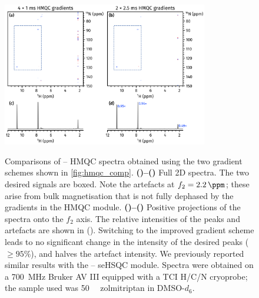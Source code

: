 \documentclass[a4paper,11pt]{article}
\newcommand{\proton}{\ch{^{1}H}}
\newcommand{\nitrogen}{\ch{^{15}N}}
\newcommand{\HN}{\proton{}--\nitrogen{}}
\newcommand*{\zolmi}{Spectra were obtained on a \SI{700}{\MHz} Bruker AV III equipped with a TCI H/C/N cryoprobe; the sample used was \SI{50}{\milli\molar} zolmitriptan in DMSO-\(d_6\).}
\begin{document}
\begin{refsection}
\begin{figure}[H]
    \centering
    \includegraphics[width=0.8\textwidth]{hmqc_comp_snr.png}
    {\label{fig:hmqc_comp_snr_bad2d}}
    {\label{fig:hmqc_comp_snr_good2d}}
    {\label{fig:hmqc_comp_snr_bad1d}}
    {\label{fig:hmqc_comp_snr_good1d}}
    \caption{
        Comparisons of \HN{} HMQC spectra obtained using the two gradient schemes shown in \cref{fig:hmqc_comp}.
        \textbf{()--()} Full 2D spectra.
        The two desired signals are boxed.
        Note the artefacts at \(f_2 = \SI{2.2}{\ppm}\); these arise from bulk magnetisation that is not fully dephased by the gradients in the HMQC module.
        \textbf{()--()} Positive projections of the spectra onto the \(f_2\) axis.
        The relative intensities of the peaks and artefacts are shown in ().
        Switching to the improved gradient scheme leads to no significant change in the intensity of the desired peaks (\(\geq 95\%\)), and halves the artefact intensity.
        We previously reported similar results with the \HN{} seHSQC module.\autocite{Yong2021JMR}
        \zolmi{}
    }
    \label{fig:hmqc_comp_snr}
\end{figure}

\printbibliography{}
\end{refsection}
\end{document}
